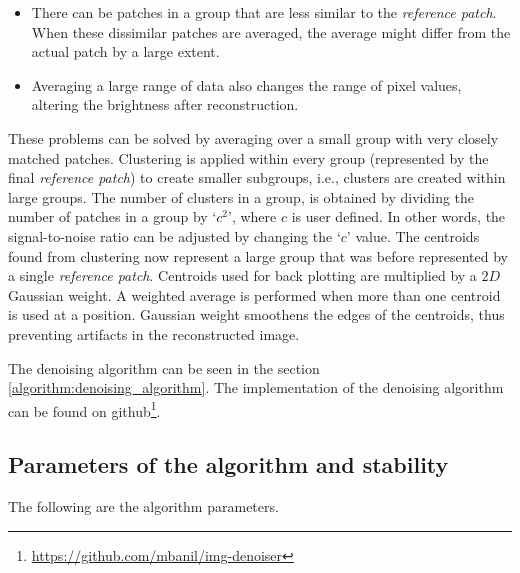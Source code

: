\documentclass[fleqn,10pt]{wlscirep}
\begin{document}
\begin{itemize}
	\item There can be patches in a group that are less similar to the \textit{reference patch}. When these dissimilar patches are averaged, the average might differ from the actual patch by a large extent. 
	\item Averaging a large range of data also changes the range of pixel values,
	altering the brightness after reconstruction.
\end{itemize}

These problems can be solved by averaging over a small group with very closely matched patches. Clustering is applied within every group (represented by the final \textit{reference patch}) to create smaller subgroups, i.e., clusters are created within large groups. The number of clusters in a group, is obtained by dividing the number of patches in a group by `$c^2$’, where $c$ is user defined. In other words, the signal-to-noise ratio can be adjusted by changing the `$c$’ value. The centroids found from clustering now represent a large group that was before represented by a single \textit{reference patch}.  Centroids used for back plotting are multiplied by a $2D$ Gaussian weight. A weighted average is performed when more than one centroid is used at a position. Gaussian weight smoothens the edges of the centroids, thus preventing artifacts in the reconstructed image. 

The denoising algorithm can be seen in the section \ref{algorithm:denoising_algorithm}. The implementation of the denoising algorithm can be found on github\footnote{\url{https://github.com/mbanil/img-denoiser}}.

\subsection*{Parameters of the algorithm and stability}

The following are the algorithm parameters.
\end{document}
